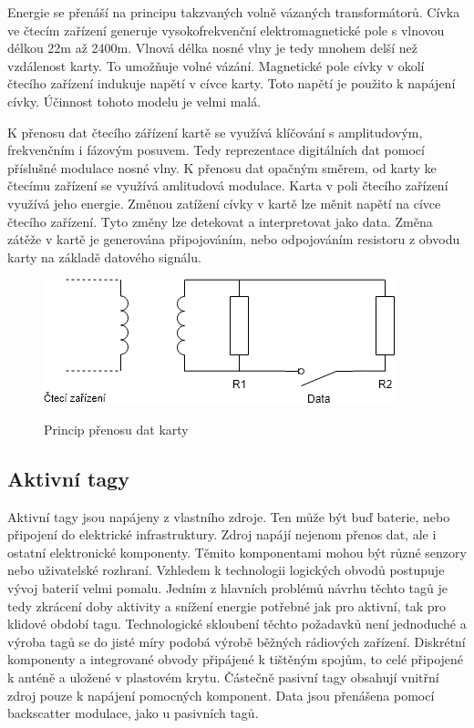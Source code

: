 Energie se přenáší na principu takzvaných volně vázaných transformátorů. Cívka ve čtecím zařízení generuje vysokofrekvenční elektromagnetické pole s vlnovou délkou 22m až 2400m. Vlnová délka nosné vlny je tedy mnohem delší než vzdálenost karty. To umožňuje volné vázání. Magnetické pole cívky v okolí čtecího zařízení indukuje napětí v cívce karty. Toto napětí je použito k napájení cívky. Účinnost tohoto modelu je velmi malá.\cite{Smart_card_handbook}\par
K přenosu dat čtecího zářízení kartě se využívá klíčování s amplitudovým, frekvenčním i fázovým posuvem. Tedy reprezentace digitálních dat pomocí příslušné modulace nosné vlny. K přenosu dat opačným směrem, od karty ke čtecímu zařízení se využívá amlitudová modulace. Karta v poli čtecího zařízení využívá jeho energie. Změnou zatížení cívky v kartě lze měnit napětí na cívce čtecího zařízení. Tyto změny lze detekovat a interpretovat jako data. Změna zátěže v kartě je generována připojováním, nebo odpojováním resistoru z obvodu karty na základě datového signálu.\cite{Smart_card_handbook}\par

\begin{figure}[ht]\centering
  \centering
  \includegraphics[width=\linewidth]{obrazky-figures/obrazekRFIDDataTransfer.png}\\[1pt]  
  \caption{Princip přenosu dat karty}    
  \label{obrazekStrukturaSpecialnichBloku}
\end{figure}

\subsection{Aktivní tagy} 
Aktivní tagy jsou napájeny z vlastního zdroje. Ten může být buď baterie, nebo připojení do elektrické infrastruktury. Zdroj napájí nejenom přenos dat, ale i ostatní elektronické komponenty. Těmito komponentami mohou být různé senzory nebo uživatelské rozhraní\cite{RFID_explained}. Vzhledem k technologii logických obvodů postupuje vývoj baterií velmi pomalu. Jedním z hlavních problémů návrhu těchto tagů je tedy zkrácení doby aktivity a snížení energie potřebné jak pro aktivní, tak pro klidové období tagu. Technologické skloubení těchto požadavků není jednoduché a výroba tagů se do jisté míry podobá výrobě běžných rádiových zařízení. Diskrétní komponenty a integrované obvody připájené k tištěným spojům, to celé připojené k anténě a uložené v plastovém krytu\cite{The_RF_in_RFID}. 
Částečně pasivní tagy obsahují vnitřní zdroj pouze k napájení pomocných komponent. Data jsou přenášena pomocí backscatter modulace, jako u pasivních tagů\cite{Survey_of_RFID_Tags}.


